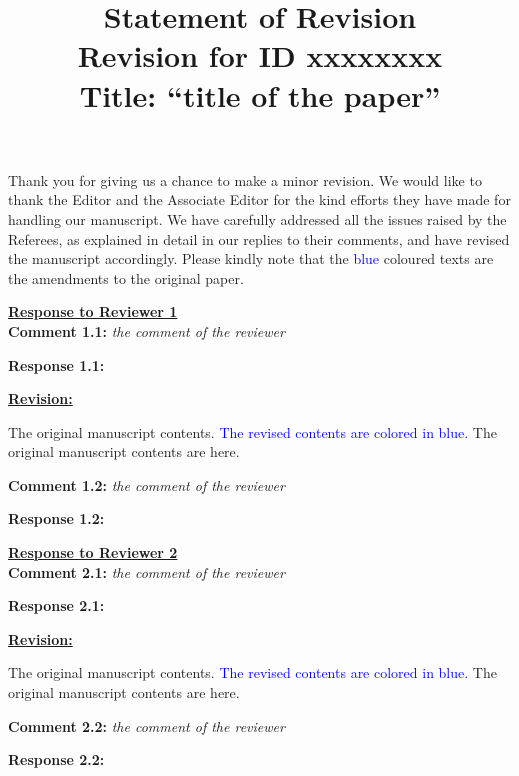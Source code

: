 \documentclass[12pt]{article}
\begin{document}
\title{Statement of Revision \\\large{Revision for ID  xxxxxxxx }\\\large{Title: ``title of the paper''}}


\maketitle

Thank you for giving us a chance to make a minor revision. We would like to thank the Editor and the Associate Editor for the kind efforts they have made for handling our manuscript. We have carefully addressed all the issues raised by the Referees, as explained in detail in our replies to their comments, and have revised the manuscript accordingly. Please kindly note that the \textcolor{blue}{blue} coloured texts are the amendments to the original paper. 

\vspace{50pt}
\underline{\textbf{\Large {Response to Reviewer 1}}}
\\

\textbf{\large{Comment 1.1:}}  \emph{the comment of the reviewer} 

\textbf{\large{Response 1.1:}}

\underline{\textbf{\Large{Revision:}}}

The original manuscript contents. \textcolor{blue}{The revised contents are colored in blue.} The original manuscript contents are here. 


\vspace{50pt}

\textbf{\large{Comment 1.2:}}  \emph{the comment of the reviewer} 

\textbf{\large{Response 1.2:}}

\vsapce{50pt}




\underline{\textbf{\Large {Response to Reviewer 2}}}
\\


\textbf{\large{Comment 2.1:}}  \emph{the comment of the reviewer}

\textbf{\large{Response 2.1:}}

\underline{\textbf{\Large{Revision:}}}

The original manuscript contents. \textcolor{blue}{The revised contents are colored in blue.} The original manuscript contents are here.



\vspace{50pt}

\textbf{\large{Comment 2.2:}}  \emph{the comment of the reviewer}

\textbf{\large{Response 2.2:}}

\vspace{50pt}


 



 
\end{document}
